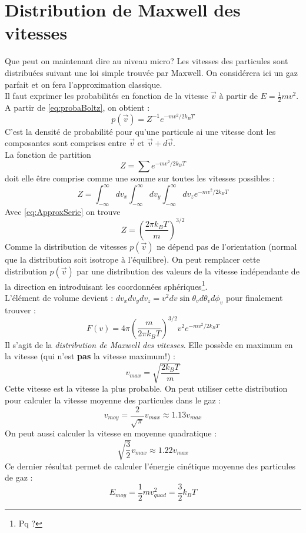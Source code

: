 \documentclass[british,french,11pt, a4paper, openany]{book}
\begin{document}
\section{Distribution de Maxwell des vitesses}
Que peut on maintenant dire au niveau micro? Les vitesses des particules sont distribuées suivant
une loi simple trouvée par Maxwell. On considérera ici un gaz parfait et on fera l'approximation
classique.\\
Il faut exprimer les probabilités en fonction de la vitesse $\vec{v}$ à partir de $E = \frac{1}{2}
mv^2$. A partir de \autoref{eq:probaBoltz}, on obtient :
\begin{equation}
	p(\vec{v}) = Z^{-1}e^{-mv^2/2k_BT}
\end{equation}
C'est la densité de probabilité pour qu'une particule ai une vitesse dont les composantes sont 
comprises entre $\vec{v}$ et $\vec{v} +d\vec{v}$.\\
La fonction de partition
\begin{equation}
	Z = \sum e^{-mv^2/2k_BT}
\end{equation}
doit elle être comprise comme une somme sur toutes les vitesses possibles :
\begin{equation}
	Z = \int_{-\infty}^\infty dv_x \int_{-\infty}^\infty dv_y \int_{-\infty}^\infty dv_z 
	e^{-mv^2/2k_BT}
\end{equation}
Avec \autoref{eq:ApproxSerie} on trouve
\begin{equation}
	Z = \left(\dfrac{2\pi k_BT}{m}\right)^{3/2}
\end{equation}
Comme la distribution de vitesses $p(\vec{v})$ ne dépend pas de l'orientation (normal que la 
distribution soit isotrope à l'équilibre). On peut remplacer cette distribution $p(\vec{v})$ 
par une distribution des valeurs de la vitesse indépendante de la direction en introduisant
les coordonnées sphériques\footnote{Pq ?}.\\
L'élément de volume devient : $dv_xdv_ydv_z = v^2dv\sin\theta_vd\theta_vd\phi_v$ pour finalement
trouver :
\begin{equation}
	F(v) = 4\pi\left(\dfrac{m}{2\pi k_BT}\right)^{3/2} v^2 e^{-mv^2/2k_BT}
\end{equation}
Il s'agit de la \textit{distribution de Maxwell des vitesses}. Elle possède en maximum en la 
vitesse (qui n'est \textbf{pas} la vitesse maximum!) : 
\begin{equation}
	v_{max} = \sqrt{\dfrac{2k_BT}{m}}
\end{equation}
Cette vitesse est la vitesse la plus probable. On peut utiliser cette distribution pour calculer 
la vitesse moyenne des particules dans le gaz :
\begin{equation}
	v_{moy} = \frac{2}{\sqrt{\pi}}v_{max} \approx 1.13 v_{max}
\end{equation}
On peut aussi calculer la vitesse en moyenne quadratique :
\begin{equation}
	\sqrt{\frac{3}{2}}v_{max} \approx 1.22 v_{max}
\end{equation}
Ce dernier résultat permet de calculer l'énergie cinétique moyenne des particules de gaz :
\begin{equation}
	E_{moy} = \frac{1}{2}mv^2_{quad} = \frac{3}{2}k_BT
\end{equation}
\end{document}
